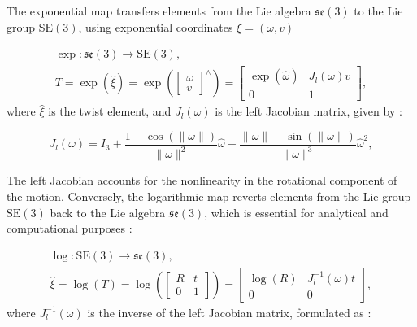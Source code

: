 The exponential map transfers elements from the Lie algebra \(\mathfrak{se}(3)\) to the Lie group \(\mathrm{SE}(3)\), using exponential coordinates \(\xi = (\omega, v)\) \cite{wangNonparametricSecondOrderTheory2008}

\begin{equation}
    \begin{aligned}
        \exp : \mathfrak{se}(3) \rightarrow \mathrm{SE}(3), \\
        T = \exp(\hat{\xi}) = \exp \left(\begin{bmatrix} \omega \\ v \end{bmatrix}^\wedge \right) = \begin{bmatrix} \exp(\hat{\omega}) & J_l(\omega) v \\ 0 & 1 \end{bmatrix},
    \end{aligned}
    \label{eq:exp_SE3}
\end{equation}
where \(\hat{\xi}\) is the twist element, and \(J_l(\omega)\) is the left Jacobian matrix, given by \cite{wangNonparametricSecondOrderTheory2008}:

\begin{equation}
    J_l(\omega) = I_3 + \frac{1 - \cos(\|\omega\|)}{\|\omega\|^2} \hat{\omega} + \frac{\|\omega\| - \sin(\|\omega\|)}{\|\omega\|^3} \hat{\omega}^2,
    \label{eq:left_Jacobian}
\end{equation}

The left Jacobian accounts for the nonlinearity in the rotational component of the motion. Conversely, the logarithmic map reverts elements from the Lie group \(\mathrm{SE}(3)\) back to the Lie algebra \(\mathfrak{se}(3)\), which is essential for analytical and computational purposes \cite{wangNonparametricSecondOrderTheory2008}:

\begin{equation}
    \begin{aligned}
        \log : \mathrm{SE}(3) \rightarrow \mathfrak{se}(3), \\
        \hat{\xi} = \log(T) = \log\left(\begin{bmatrix} R & t \\ 0 & 1 \end{bmatrix}\right) = \begin{bmatrix} \log(R) & J_l^{-1}(\omega) t \\ 0 & 0 \end{bmatrix},
    \end{aligned}
    \label{eq:log_SE3}
\end{equation}
where \(J_l^{-1}(\omega)\) is the inverse of the left Jacobian matrix, formulated as \cite{wangNonparametricSecondOrderTheory2008}:

